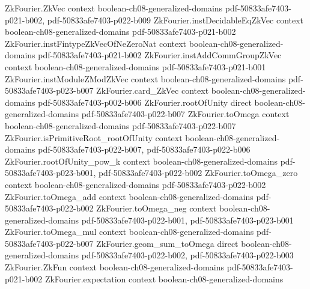 \begin{lemma}
\label{ZkFourier.parseval_identity}
\leanok
{}
\proofstep
  {ZkFourier.ZkVec}
  {context}
  {boolean-ch08-generalized-domains}
  {pdf-50833afe7403-p021-b002,
    pdf-50833afe7403-p022-b009}
\proofstep
  {ZkFourier.instDecidableEqZkVec}
  {context}
  {boolean-ch08-generalized-domains}
  {pdf-50833afe7403-p021-b002}
\proofstep
  {ZkFourier.instFintypeZkVecOfNeZeroNat}
  {context}
  {boolean-ch08-generalized-domains}
  {pdf-50833afe7403-p021-b002}
\proofstep
  {ZkFourier.instAddCommGroupZkVec}
  {context}
  {boolean-ch08-generalized-domains}
  {pdf-50833afe7403-p021-b001}
\proofstep
  {ZkFourier.instModuleZModZkVec}
  {context}
  {boolean-ch08-generalized-domains}
  {pdf-50833afe7403-p023-b007}
\proofstep
  {ZkFourier.card_ZkVec}
  {context}
  {boolean-ch08-generalized-domains}
  {pdf-50833afe7403-p002-b006}
\proofstep
  {ZkFourier.rootOfUnity}
  {direct}
  {boolean-ch08-generalized-domains}
  {pdf-50833afe7403-p022-b007}
\proofstep
  {ZkFourier.toOmega}
  {context}
  {boolean-ch08-generalized-domains}
  {pdf-50833afe7403-p022-b007}
\proofstep
  {ZkFourier.isPrimitiveRoot_rootOfUnity}
  {context}
  {boolean-ch08-generalized-domains}
  {pdf-50833afe7403-p022-b007,
    pdf-50833afe7403-p022-b006}
\proofstep
  {ZkFourier.rootOfUnity_pow_k}
  {context}
  {boolean-ch08-generalized-domains}
  {pdf-50833afe7403-p023-b001,
    pdf-50833afe7403-p022-b002}
\proofstep
  {ZkFourier.toOmega_zero}
  {context}
  {boolean-ch08-generalized-domains}
  {pdf-50833afe7403-p022-b002}
\proofstep
  {ZkFourier.toOmega_add}
  {context}
  {boolean-ch08-generalized-domains}
  {pdf-50833afe7403-p022-b002}
\proofstep
  {ZkFourier.toOmega_neg}
  {context}
  {boolean-ch08-generalized-domains}
  {pdf-50833afe7403-p022-b001,
    pdf-50833afe7403-p023-b001}
\proofstep
  {ZkFourier.toOmega_mul}
  {context}
  {boolean-ch08-generalized-domains}
  {pdf-50833afe7403-p022-b007}
\proofstep
  {ZkFourier.geom_sum_toOmega}
  {direct}
  {boolean-ch08-generalized-domains}
  {pdf-50833afe7403-p022-b002,
    pdf-50833afe7403-p022-b003}
\proofstep
  {ZkFourier.ZkFun}
  {context}
  {boolean-ch08-generalized-domains}
  {pdf-50833afe7403-p021-b002}
\proofstep
  {ZkFourier.expectation}
  {context}
  {boolean-ch08-generalized-domains}

\end{lemma}
